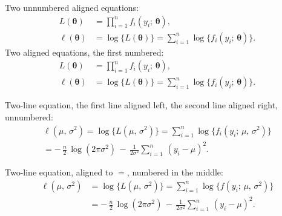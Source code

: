 Two unnumbered aligned equations:
\begin{align*}
L(\bm\theta) &= \prod_{i=1}^n f_i(y_i;\,\bm\theta), \\
\ell(\bm\theta) &= \log\bigl\{L(\bm\theta)\bigr\} = 
\sum_{i=1}^n \log\bigl\{f_i(y_i;\,\bm\theta)\bigr\}.
\end{align*}
Two aligned equations, the first numbered:
\begin{align}
L(\bm\theta) &= \prod_{i=1}^n f_i(y_i;\,\bm\theta), \label{eq01:L} \\
\ell(\bm\theta) &= \log\bigl\{L(\bm\theta)\bigr\} = 
\sum_{i=1}^n \log\bigl\{f_i(y_i;\,\bm\theta)\bigr\}. \nonumber
\end{align}

Two-line equation, the first line aligned left, the second line
aligned right, unnumbered:
\begin{multline*}
\ell(\mu,\,\sigma^2) = \log\bigl\{L(\mu,\,\sigma^2)\bigr\} = 
\sum_{i=1}^n \log\bigl\{f_i(y_i;\,\mu,\,\sigma^2)\bigr\} \\
  = -\,\frac{n}{2}\,\log(2\pi\sigma^2) \,-\, 
\frac{1}{2\sigma^2}\sum_{i=1}^n\,(y_i - \mu)^2. 
\end{multline*}

Two-line equation, aligned to $=$, numbered in the middle:
\begin{equation}\label{eq01:ell}
\begin{split}
\ell(\mu,\,\sigma^2) &= \log\bigl\{L(\mu,\,\sigma^2)\bigr\} = 
\sum_{i=1}^n \log\bigl\{f(y_i;\,\mu,\,\sigma^2)\bigr\} \\
& = -\,\frac{n}{2}\,\log(2\pi\sigma^2) \,-\, 
\frac{1}{2\sigma^2}\sum_{i=1}^n\,(y_i - \mu)^2. 
\end{split}
\end{equation}
